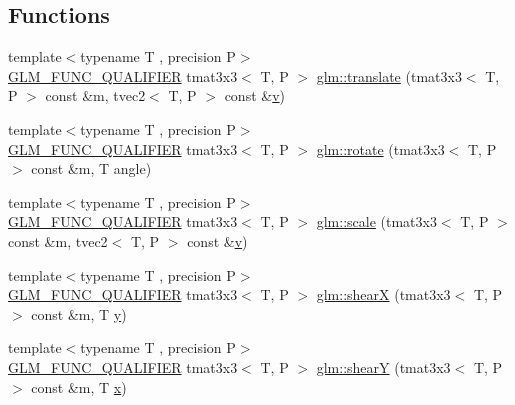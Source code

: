 \subsection*{Functions}
\begin{DoxyCompactItemize}
\item 
{\footnotesize template$<$typename T , precision P$>$ }\\\mbox{\hyperlink{setup_8hpp_a33fdea6f91c5f834105f7415e2a64407}{G\+L\+M\+\_\+\+F\+U\+N\+C\+\_\+\+Q\+U\+A\+L\+I\+F\+I\+ER}} tmat3x3$<$ T, P $>$ \mbox{\hyperlink{group__gtx__matrix__transform__2d_ga3786656ac137084ef73151636eff44d8}{glm\+::translate}} (tmat3x3$<$ T, P $>$ const \&m, tvec2$<$ T, P $>$ const \&\mbox{\hyperlink{glad_8h_a14cfbe2fc2234f5504618905b69d1e06}{v}})
\item 
{\footnotesize template$<$typename T , precision P$>$ }\\\mbox{\hyperlink{setup_8hpp_a33fdea6f91c5f834105f7415e2a64407}{G\+L\+M\+\_\+\+F\+U\+N\+C\+\_\+\+Q\+U\+A\+L\+I\+F\+I\+ER}} tmat3x3$<$ T, P $>$ \mbox{\hyperlink{group__gtx__matrix__transform__2d_ga23ec870ee4b75d85cc021e0fd1532b48}{glm\+::rotate}} (tmat3x3$<$ T, P $>$ const \&m, T angle)
\item 
{\footnotesize template$<$typename T , precision P$>$ }\\\mbox{\hyperlink{setup_8hpp_a33fdea6f91c5f834105f7415e2a64407}{G\+L\+M\+\_\+\+F\+U\+N\+C\+\_\+\+Q\+U\+A\+L\+I\+F\+I\+ER}} tmat3x3$<$ T, P $>$ \mbox{\hyperlink{group__gtx__matrix__transform__2d_gadb9f2a729d399ae5e9c33eb64d0d66fe}{glm\+::scale}} (tmat3x3$<$ T, P $>$ const \&m, tvec2$<$ T, P $>$ const \&\mbox{\hyperlink{glad_8h_a14cfbe2fc2234f5504618905b69d1e06}{v}})
\item 
{\footnotesize template$<$typename T , precision P$>$ }\\\mbox{\hyperlink{setup_8hpp_a33fdea6f91c5f834105f7415e2a64407}{G\+L\+M\+\_\+\+F\+U\+N\+C\+\_\+\+Q\+U\+A\+L\+I\+F\+I\+ER}} tmat3x3$<$ T, P $>$ \mbox{\hyperlink{group__gtx__matrix__transform__2d_gab3363478cb625e40c5bd924fd838cf54}{glm\+::shearX}} (tmat3x3$<$ T, P $>$ const \&m, T \mbox{\hyperlink{glad_8h_a66ddd433d2cacfe27f5906b7e86faeed}{y}})
\item 
{\footnotesize template$<$typename T , precision P$>$ }\\\mbox{\hyperlink{setup_8hpp_a33fdea6f91c5f834105f7415e2a64407}{G\+L\+M\+\_\+\+F\+U\+N\+C\+\_\+\+Q\+U\+A\+L\+I\+F\+I\+ER}} tmat3x3$<$ T, P $>$ \mbox{\hyperlink{group__gtx__matrix__transform__2d_ga69bfb47d250df7464a5b14f2b95a9b4a}{glm\+::shearY}} (tmat3x3$<$ T, P $>$ const \&m, T \mbox{\hyperlink{glad_8h_a92d0386e5c19fb81ea88c9f99644ab1d}{x}})
\end{DoxyCompactItemize}
